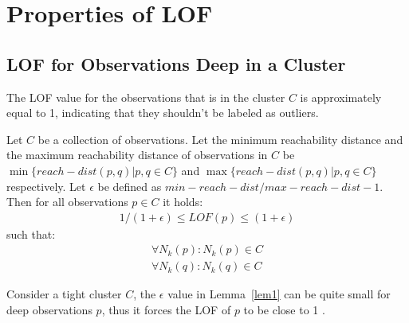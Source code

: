 \section{Properties of LOF}
\subsection{LOF for Observations Deep in a Cluster} The LOF value for the observations that is in the cluster $C$ is approximately equal to 1, indicating that they shouldn't be labeled as outliers.
\begin{lem}
\label{lem1}
\citep{Markus} Let $C$ be a collection of observations. 
Let the minimum reachability distance and the maximum reachability distance of observations in $C$ be $\min \lbrace reach-dist(p,q)|p,q \in C \rbrace$ and $\max \lbrace reach-dist(p,q)|p,q \in C \rbrace$ respectively. Let $\epsilon$ be defined as $min-reach-dist/max-reach-dist-1$. Then for all observations $p \in C$ it holds:
\begin{align}
1/(1+\epsilon) \leq LOF(p) \leq (1+\epsilon)
\end{align}
such that:
\begin{align}
\forall N_k(p):N_k(p) \in C \\
\forall N_k(q):N_k(q) \in C
\end{align}
\begin{comment}
(i) all the $k$-nearest neighbors q of p are in C, and
(ii) all the $k$-nearest neighbors o of q are also in C,
it holds that 1/(1 + ε) ≤ LOF(p) ≤ (1 + ε).
\end{comment}
\end{lem}
Consider a tight cluster $C$, the $\epsilon$ value in Lemma~\ref{lem1} can be quite small for deep observations $p$, thus it forces the LOF of $p$ to be close to 1 \citep{Markus}.
